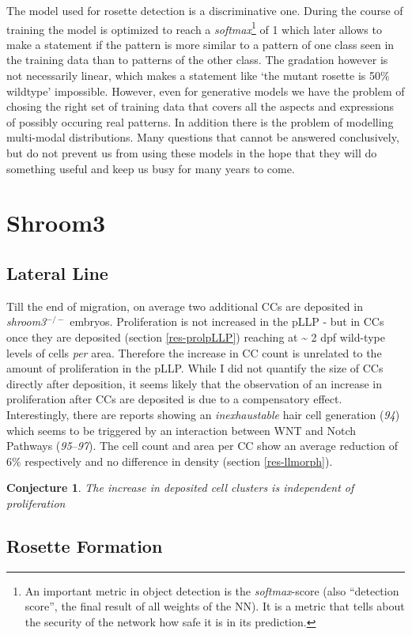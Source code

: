 \documentclass[11pt,singlespacinge,twoside]{reedthesis} %
\newtheorem{conjecture}{Conjecture}[chapter]
\theoremstyle{definition}
\theoremstyle{definition}
\theoremstyle{definition}
\theoremstyle{remark}
\begin{document}
The model used for rosette detection is a discriminative one. During the course of training the model is optimized to reach a \emph{softmax}\footnote{An important metric in object detection is the \emph{softmax}-score (also ``detection score'', the final result of all weights of the NN). It is a metric that tells about the security of the network how safe it is in its prediction.} of 1 which later allows to make a statement if the pattern is more similar to a pattern of one class seen in the training data than to patterns of the other class. The gradation however is not necessarily linear, which makes a statement like `the mutant rosette is 50\(\%\) wildtype' impossible. However, even for generative models we have the problem of chosing the right set of training data that covers all the aspects and expressions of possibly occuring real patterns. In addition there is the problem of modelling multi-modal distributions. Many questions that cannot be answered conclusively, but do not prevent us from using these models in the hope that they will do something useful and keep us busy for many years to come.

\hypertarget{shroom3-1}{%
\section{Shroom3}\label{shroom3-1}}

\hypertarget{lateral-line}{%
\subsection{Lateral Line}\label{lateral-line}}

Till the end of migration, on average two additional CCs are deposited in \emph{shroom3}\(^{-/-}\) embryos. Proliferation is not increased in the pLLP - but in CCs once they are deposited (section \ref{res-prolpLLP}) reaching at \textasciitilde{} 2 dpf wild-type levels of cells \emph{per} area. Therefore the increase in CC count is unrelated to the amount of proliferation in the pLLP. While I did not quantify the size of CCs directly after deposition, it seems likely that the observation of an increase in proliferation after CCs are deposited is due to a compensatory effect. Interestingly, there are reports showing an \emph{inexhaustable} hair cell generation (\emph{94}) which seems to be triggered by an interaction between WNT and Notch Pathways (\emph{95}--\emph{97}). The cell count and area per CC show an average reduction of 6\(\%\) respectively and no difference in density (section \ref{res-llmorph}).
\begin{conjecture}
\protect\hypertarget{cnj:unnamed-chunk-12}{}{\label{cnj:unnamed-chunk-12} }The increase in deposited cell clusters is independent of proliferation
\end{conjecture}
\hypertarget{rosette-formation-1}{%
\subsection{Rosette Formation}\label{rosette-formation-1}}
\end{document}
